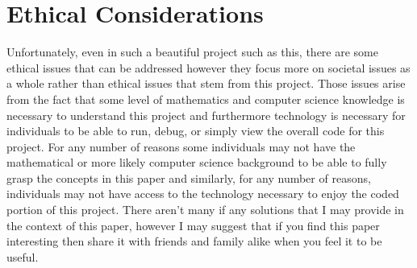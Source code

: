 \documentclass{article}
\begin{document}
    \section{Ethical Considerations}
    Unfortunately, even in such a beautiful project such as this, there are some ethical issues that can be addressed however they focus more on societal issues as a whole rather than ethical issues that stem from this project. Those issues arise from the fact that some level of mathematics and computer science knowledge is necessary to understand this project and furthermore technology is necessary for individuals to be able to run, debug, or simply view the overall code for this project. For any number of reasons some individuals may not have the mathematical or more likely computer science background to be able to fully grasp the concepts in this paper and similarly, for any number of reasons, individuals may not have access to the technology necessary to enjoy the coded portion of this project. There aren't many if any solutions that I may provide in the context of this paper, however I may suggest that if you find this paper interesting then share it with friends and family alike when you feel it to be useful.   
    \newpage
    
    \nocite{*}
    
\end{document}
